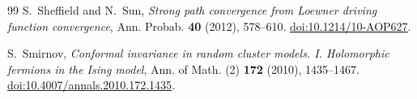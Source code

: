 \begin{thebibliography}{99}
S.~Sheffield and N.~Sun,
\emph{Strong path convergence from Loewner driving function convergence},
Ann. Probab. \textbf{40} (2012), 578--610.
\href{https://doi.org/10.1214/10-AOP627}{doi:10.1214/10-AOP627}.

S.~Smirnov,
\emph{Conformal invariance in random cluster models. I. Holomorphic fermions in the Ising model},
Ann. of Math. (2) \textbf{172} (2010), 1435--1467.
\href{https://doi.org/10.4007/annals.2010.172.1435}{doi:10.4007/annals.2010.172.1435}.

\end{thebibliography}
\endgroup
